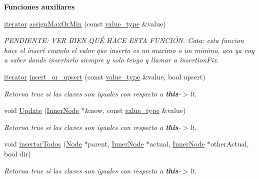 \begin{Indent}{\bf Funciones auxiliares}
\begin{DoxyCompactItemize}
\hyperlink{classaed2_1_1map_1_1iterator}{iterator} \hyperlink{classaed2_1_1map_a50aae07014200a53b95394f349f55948_a50aae07014200a53b95394f349f55948}{assign\-Max\-Or\-Min} (const \hyperlink{classaed2_1_1map_a719db98e0ff9a837610f76be33264680_a719db98e0ff9a837610f76be33264680}{value\-\_\-type} \&value)
\begin{DoxyCompactList}\small\item\em P\-E\-N\-D\-I\-E\-N\-T\-E\-: V\-E\-R B\-I\-E\-N Q\-UÉ H\-A\-C\-E E\-S\-T\-A F\-U\-N\-C\-IÓ\-N. Cata\-: esta funcion hace el insert cuando el valor que inserto es un maximo o un minimo, aca ya voy a saber donde insertarlo siempre y solo tengo q llamar a insertion\-Fix. \end{DoxyCompactList}\item 
\hyperlink{classaed2_1_1map_1_1iterator}{iterator} \hyperlink{classaed2_1_1map_aef47582a93a069c4ec95da8c595e4fee_aef47582a93a069c4ec95da8c595e4fee}{insert\-\_\-or\-\_\-upsert} (const \hyperlink{classaed2_1_1map_a719db98e0ff9a837610f76be33264680_a719db98e0ff9a837610f76be33264680}{value\-\_\-type} \&value, bool upsert)
\begin{DoxyCompactList}\small\item\em Retorna true si las claves son iguales con respecto a {\bfseries this}-\/$>$lt. \end{DoxyCompactList}\item 
void \hyperlink{classaed2_1_1map_ad56871b0800aa1ba7df2eef904a35743_ad56871b0800aa1ba7df2eef904a35743}{Update} (\hyperlink{structaed2_1_1map_1_1InnerNode}{Inner\-Node} $\ast$\&now, const \hyperlink{classaed2_1_1map_a719db98e0ff9a837610f76be33264680_a719db98e0ff9a837610f76be33264680}{value\-\_\-type} \&value)
\begin{DoxyCompactList}\small\item\em Retorna true si las claves son iguales con respecto a {\bfseries this}-\/$>$lt. \end{DoxyCompactList}\item 
void \hyperlink{classaed2_1_1map_ae8d1abe96377377380da1ce5871a5dfe_ae8d1abe96377377380da1ce5871a5dfe}{insertar\-Todos} (\hyperlink{structaed2_1_1map_1_1Node}{Node} $\ast$parent, \hyperlink{structaed2_1_1map_1_1InnerNode}{Inner\-Node} $\ast$actual, \hyperlink{structaed2_1_1map_1_1InnerNode}{Inner\-Node} $\ast$other\-Actual, bool dir)
\begin{DoxyCompactList}\small\item\em Retorna true si las claves son iguales con respecto a {\bfseries this}-\/$>$lt. \end{DoxyCompactList}\item 

\end{DoxyCompactItemize}
\end{Indent}
